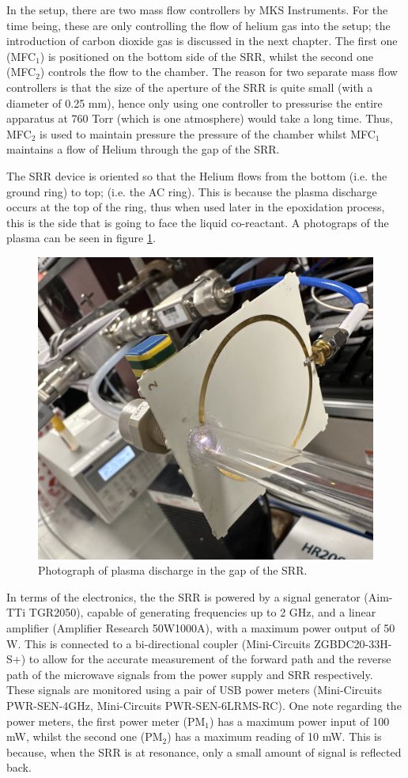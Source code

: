 In the setup, there are two mass flow controllers by MKS Instruments. For the time being, these are only controlling the flow of helium gas into the setup; the introduction of carbon dioxide gas is discussed in the next chapter. The first one (MFC$_1$)  is positioned on the bottom side of the SRR, whilst the second one (MFC$_2$) controls the flow to the chamber. The reason for two separate mass flow controllers is that the size of the aperture of the SRR is quite small (with a diameter of 0.25 mm), hence only using one controller to pressurise the entire apparatus at 760 Torr (which is one atmosphere) would take a long time. Thus, MFC$_2$ is used to maintain pressure the pressure of the chamber whilst MFC$_1$ maintains a flow of Helium through the gap of the SRR. 

The SRR device is oriented so that the Helium flows from the bottom (i.e. the ground ring) to top; (i.e. the AC ring). This is because the plasma discharge occurs at the top of the ring, thus when used later in the epoxidation process, this is the side that is going to face the liquid co-reactant. A photograps of the plasma can be seen in figure \ref{fig:SRR_plasma}. 

\begin{figure}[h!]
	\centering
	\includegraphics[width=0.55\linewidth]{chapter_4/figures/plasma.jpeg}
	\caption{Photograph of plasma discharge in the gap of the SRR.}
	\label{fig:SRR_plasma}
\end{figure}


In terms of the electronics, the the SRR is powered by a signal generator (Aim-TTi TGR2050), capable of generating frequencies up to 2 GHz, and a linear amplifier (Amplifier Research 50W1000A), with a maximum power output of 50 W. This is connected to a bi-directional coupler (Mini-Circuits ZGBDC20-33H-S+) to allow for the accurate measurement of the forward path and the reverse path of the microwave signals from the power supply and SRR respectively. These signals are monitored using a pair of USB power meters (Mini-Circuits PWR-SEN-4GHz, Mini-Circuits PWR-SEN-6LRMS-RC). One note regarding the power meters, the first power meter (PM$_1$) has a maximum power input of 100 mW, whilst the second one (PM$_2$) has a maximum reading of 10 mW. This is because, when the SRR is at resonance, only a small amount of signal is reflected back. 

